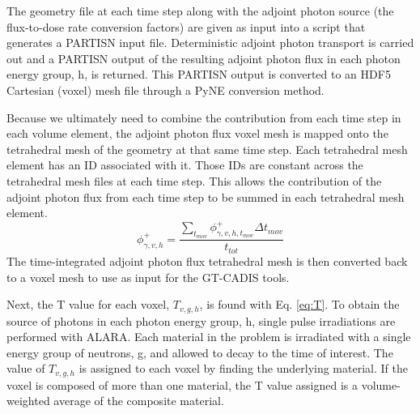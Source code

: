 The geometry file at each time step along with the adjoint photon source (the
flux-to-dose rate conversion factors) are given as input into a script that
generates a PARTISN input file.  Deterministic adjoint photon transport is
carried out and a PARTISN output of the resulting adjoint photon flux in each
photon energy group, h, is
returned.  This PARTISN output is converted to an HDF5 Cartesian (voxel) mesh file
through a PyNE conversion method.  

Because we ultimately need to combine the contribution from each time step in each
volume element, the adjoint photon flux voxel mesh is mapped onto the
tetrahedral mesh of the geometry at that same time step.  Each tetrahedral
mesh element has an ID associated with it.  Those IDs are constant across the
tetrahedral mesh files at each time step.  This allows the contribution of the adjoint photon 
flux from each time step to be summed in each tetrahedral mesh element.
\begin{equation}\label{eq:sum}
	\phi_{\gamma,v, h}^{+} =
	\frac{\sum_{t_{mov}}{\phi_{\gamma,v,h,t_{mov}}^{+}}\Delta{t_{mov}}}
	{t_{tot}}
\end{equation}
The time-integrated 
adjoint photon flux tetrahedral mesh is then converted back to a voxel mesh
to use as input for the GT-CADIS tools. 

Next, the T value for each voxel, $T_{v,g,h}$,
 is found with Eq. \ref{eq:T}.
To obtain the source of photons in each photon energy group, h, 
single pulse irradiations are performed with ALARA.
Each material in the problem is irradiated with a single energy group of
neutrons, g, and allowed to decay to the time of interest.  The value
of $T_{v,g,h}$ is assigned to each voxel by finding the underlying material.
If the voxel is composed of more than one material, the T value assigned is
a volume-weighted average of the composite material.

